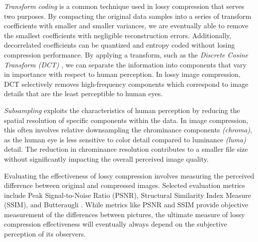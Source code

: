 
\emph{Transform coding} is a common technique used in lossy compression that serves two purposes. By compacting the original data samples into a series of transform coefficients with smaller and smaller variances, we are eventually able to remove the smallest coefficients with negligible reconstruction errors. Additionally, decorrelated coefficients can be quantized and entropy coded without losing compression performance. By applying a transform, such as the \emph{Discrete Cosine Transform (DCT)} \cite{ahmed1974dct}, we can separate the information into components that vary in importance with respect to human perception. In lossy image compression, DCT selectively removes high-frequency components \cite{wang2023dct-50-years} which correspond to image details that are the least perceptible to human eyes.




\emph{Subsampling} exploits the characteristics of human perception by reducing the spatial resolution of specific components within the data. In image compression, this often involves relative downsampling the chrominance components \emph{(chroma)}, as the human eye is less sensitive to color detail compared to luminance \emph{(luma)} detail. The reduction in chrominance resolution contributes to a smaller file size without significantly impacting the overall perceived image quality.


Evaluating the effectiveness of lossy compression involves measuring the perceived difference between original and compressed images. Selected evaluation metrics include Peak Signal-to-Noise Ratio (PSNR), Structural Similarity Index Measure (SSIM), and Butteraugli \cite{hore2010image-quality-metrics}. While metrics like PSNR and SSIM provide objective measurement of the differences between pictures, the ultimate measure of lossy compression effectiveness will eventually always depend on the subjective perception of its observers.

